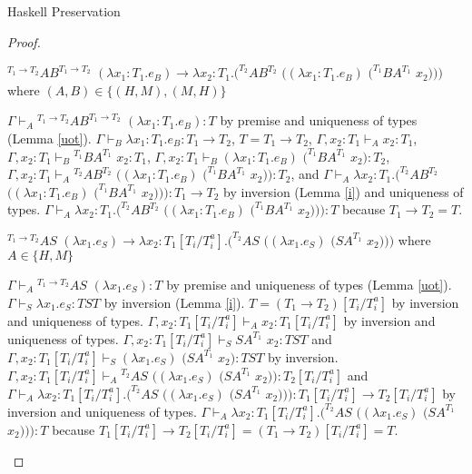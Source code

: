 \begin{theorem}{Haskell Preservation}
\begin{proof}

\begin{case}{\redrule{\oshmfabsa}{\oshmfabsb}}

$^{T_{1}\rightarrow T_{2}}AB^{T_{1}\rightarrow T_{2}}$ $(\lambda x_{1}:T_{1}.e_{B})\rightarrow\lambda x_{2}:T_{1}.(^{T_{2}}AB^{T_{2}}$ $((\lambda x_{1}:T_{1}.e_{B})$ $(^{T_{1}}BA^{T_{1}}$ $x_{2})))$ where $(A,B)\in\lbrace(H,M),(M,H)\rbrace$

$\Gamma\vdash_{A}{^{T_{1}\rightarrow T_{2}}}AB^{T_{1}\rightarrow T_{2}}$ $(\lambda x_{1}:T_{1}.e_{B}):T$ by premise and uniqueness of types (Lemma \ref{uot}).  $\Gamma\vdash_{B}\lambda x_{1}:T_{1}.e_{B}:T_{1}\rightarrow T_{2}$, $T=T_{1}\rightarrow T_{2}$, $\Gamma,x_{2}:T_{1}\vdash_{A}x_{2}:T_{1}$, $\Gamma,x_{2}:T_{1}\vdash_{B}{^{T_{1}}B}A^{T_{1}}$ $x_{2}:T_{1}$, $\Gamma,x_{2}:T_{1}\vdash_{B}(\lambda x_{1}:T_{1}.e_{B})$ $(^{T_{1}}BA^{T_{1}}$ $x_{2}):T_{2}$, $\Gamma,x_{2}:T_{1}\vdash_{A}{^{T_{2}}A}B^{T_{2}}$ $((\lambda x_{1}:T_{1}.e_{B})$ $(^{T_{1}}BA^{T_{1}}$ $x_{2})):T_{2}$, and $\Gamma\vdash_{A}\lambda x_{2}:T_{1}.(^{T_{2}}AB^{T_{2}}$ $((\lambda x_{1}:T_{1}.e_{B})$ $(^{T_{1}}BA^{T_{1}}$ $x_{2}))):T_{1}\rightarrow T_{2}$ by inversion (Lemma \ref{i}) and uniqueness of types.  $\Gamma\vdash_{A}\lambda x_{2}:T_{1}.(^{T_{2}}AB^{T_{2}}$ $((\lambda x_{1}:T_{1}.e_{B})$ $(^{T_{1}}BA^{T_{1}}$ $x_{2}))):T$ because $T_{1}\rightarrow T_{2}=T$.
\end{case}


\begin{case}
$^{T_{1}\rightarrow T_{2}}AS$ $(\lambda x_{1}.e_{S})\rightarrow\lambda x_{2}:T_{1}[T_{i}/T_{i}^{a}].(^{T_{2}}AS$ $((\lambda x_{1}.e_{S})$ $(SA^{T_{1}}$ $x_{2})))$ where $A\in\lbrace H,M\rbrace$

$\Gamma\vdash_{A}{^{T_{1}\rightarrow T_{2}}A}S$ $(\lambda x_{1}.e_{S}):T$ by premise and uniqueness of types (Lemma \ref{uot}).  $\Gamma\vdash_{S}\lambda x_{1}.e_{S}:TST$ by inversion (Lemma \ref{i}).  $T=(T_{1}\rightarrow T_{2})[T_{i}/T_{i}^{a}]$ by inversion and uniqueness of types.  $\Gamma,x_{2}:T_{1}[T_{i}/T_{i}^{a}]\vdash_{A}x_{2}:T_{1}[T_{i}/T_{i}^{a}]$ by inversion and uniqueness of types.  $\Gamma,x_{2}:T_{1}[T_{i}/T_{i}^{a}]\vdash_{S}SA^{T_{1}}$ $x_{2}:TST$ and $\Gamma,x_{2}:T_{1}[T_{i}/T_{i}^{a}]\vdash_{S}(\lambda x_{1}.e_{S})$ $(SA^{T_{1}}$ $x_{2}):TST$ by inversion.  $\Gamma,x_{2}:T_{1}[T_{i}/T_{i}^{a}]\vdash_{A}{^{T_{2}}A}S$ $((\lambda x_{1}.e_{S})$ $(SA^{T_{1}}$ $x_{2})):T_{2}[T_{i}/T_{i}^{a}]$ and $\Gamma\vdash_{A}\lambda x_{2}:T_{1}[T_{i}/T_{i}^{a}].(^{T_{2}}AS$ $((\lambda x_{1}.e_{S})$ $(SA^{T_{1}}$ $x_{2}))):T_{1}[T_{i}/T_{i}^{a}]\rightarrow T_{2}[T_{i}/T_{i}^{a}]$ by inversion and uniqueness of types.  $\Gamma\vdash_{A}\lambda x_{2}:T_{1}[T_{i}/T_{i}^{a}].(^{T_{2}}AS$ $((\lambda x_{1}.e_{S})$ $(SA^{T_{1}}$ $x_{2}))):T$ because $T_{1}[T_{i}/T_{i}^{a}]\rightarrow T_{2}[T_{i}/T_{i}^{a}]=(T_{1}\rightarrow T_{2})[T_{i}/T_{i}^{a}]=T$.
\end{case}


\end{proof}
\end{theorem}
